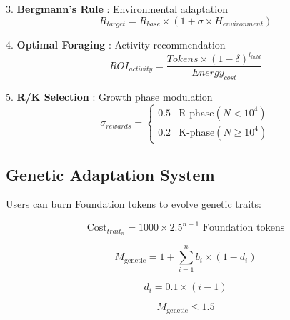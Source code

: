 \documentclass[11pt,letterpaper]{article}
\begin{document}
3. \textbf{Bergmann's Rule} \cite{bergmann1847klima}: Environmental adaptation
   \begin{equation}
   R_{target} = R_{base} \times (1 + \sigma \times H_{environment})
   \end{equation}

4. \textbf{Optimal Foraging} \cite{levin1976optimal}: Activity recommendation
   \begin{equation}
   ROI_{activity} = \frac{Tokens \times (1 - \delta)^{t_{hold}}}{Energy_{cost}}
   \end{equation}

5. \textbf{R/K Selection} \cite{macarthur1967r}: Growth phase modulation
   \begin{equation}
   \sigma_{rewards} = \begin{cases}
   0.5 & \text{R-phase} (N < 10^4) \\
   0.2 & \text{K-phase} (N \geq 10^4)
   \end{cases}
   \end{equation}

\clearpage
\subsection{Genetic Adaptation System}

Users can burn Foundation tokens to evolve genetic traits:

\begin{equation}
\text{Cost}_{trait_n} = 1000 \times 2.5^{n-1} \text{ Foundation tokens}
\end{equation}

\begin{equation}
M_{\text{genetic}} = 1 + \sum_{i=1}^{n} b_i \times (1 - d_i)
\end{equation}

\begin{equation}
d_i = 0.1 \times (i - 1)
\end{equation}

\begin{equation}
M_{\text{genetic}} \leq 1.5
\end{equation}
\end{document}
